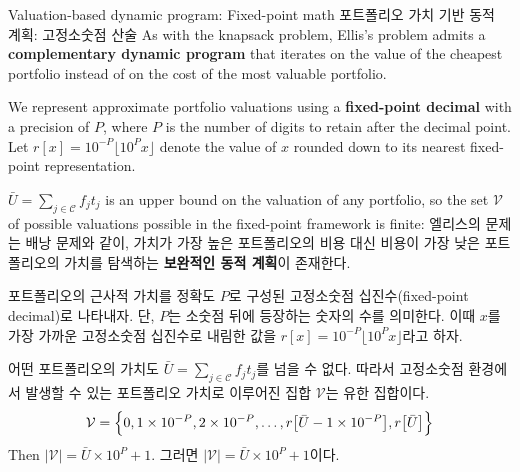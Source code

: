 \documentclass[11pt,mathserif,notheorems]{beamer}
\theoremstyle{definition}
\theoremstyle{definition}
\begin{document}
\begin{frame}{\ifen Valuation-based dynamic program: Fixed-point math \else 포트폴리오 가치 기반 동적 계획: 고정소숫점 산술 \fi}
\ifen 
As with the knapsack problem, Ellis's problem admits a \textbf{complementary dynamic program} that iterates on the value of the cheapest portfolio instead of on the cost of the most valuable portfolio.

We represent approximate portfolio valuations using a \textbf{fixed-point decimal} with a precision of $P$, where $P$ is the number of digits to retain after the decimal point. Let $r[x] =  10^{-P}\lfloor 10^P x \rfloor$ denote the value of $x$ rounded down to its nearest fixed-point representation.

$\bar U = \sum_{j\in \mathcal{C}} f_j t_j$ is an upper bound on the valuation of any portfolio, so the set $\mathcal{V}$ of possible valuations possible in the fixed-point framework is finite:
\else
엘리스의 문제는 배낭 문제와 같이, 가치가 가장 높은 포트폴리오의 비용 대신 비용이 가장 낮은 포트폴리오의 가치를 탐색하는 \textbf{보완적인 동적 계획}이 존재한다. 

포트폴리오의 근사적 가치를 정확도 $P$로 구성된 고정소숫점 십진수(fixed-point decimal)로 나타내자. 단, $P$는 소숫점 뒤에 등장하는 숫자의 수를 의미한다. 이때 $x$를 가장 가까운 고정소숫점 십진수로 내림한 값을 $r[x] =  10^{-P}\lfloor 10^P x \rfloor$라고 하자.

어떤 포트폴리오의 가치도 $\bar U = \sum_{j\in \mathcal{C}} f_j t_j$를 넘을 수 없다. 따라서 고정소숫점 환경에서 발생할 수 있는 포트폴리오 가치로 이루어진 집합 $\mathcal{V}$는 유한 집합이다.
\fi
\begin{equation*}
\mathcal{V} = \Bigl\{0, 1\times 10^{-P}, 2\times 10^{-P}, \dots, r\bigl[\bar U- 1\times 10^{-P}\bigr], r\bigl[\bar U\bigr]\Bigr\}
\end{equation*}
\ifen Then $|\mathcal{V} | = \bar U \times 10^P + 1$.
\else 그러면 $|\mathcal{V} | = \bar U \times 10^P + 1$이다.\fi
\end{frame}
\end{document}

